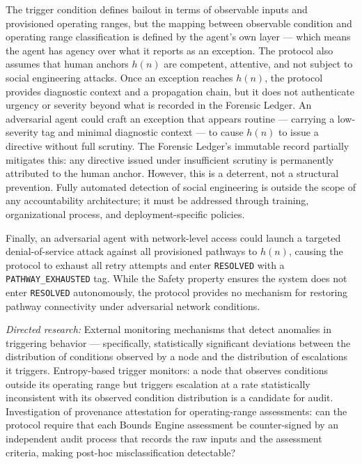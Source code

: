 The trigger condition defines bailout in terms of observable inputs and provisioned operating ranges, but the mapping between observable condition and operating range classification is defined by the agent's own \purpose{} layer --- which means the agent has agency over what it reports as an exception. The protocol also assumes that human anchors $h(n)$ are competent, attentive, and not subject to social engineering attacks. Once an exception reaches $h(n)$, the protocol provides diagnostic context and a propagation chain, but it does not authenticate urgency or severity beyond what is recorded in the Forensic Ledger. An adversarial agent could craft an exception that appears routine --- carrying a low-severity tag and minimal diagnostic context --- to cause $h(n)$ to issue a directive without full scrutiny. The Forensic Ledger's immutable record partially mitigates this: any directive issued under insufficient scrutiny is permanently attributed to the human anchor. However, this is a deterrent, not a structural prevention. Fully automated detection of social engineering is outside the scope of any accountability architecture; it must be addressed through training, organizational process, and deployment-specific policies.

Finally, an adversarial agent with network-level access could launch a targeted denial-of-service attack against all provisioned pathways to $h(n)$, causing the protocol to exhaust all retry attempts and enter \texttt{RESOLVED} with a \texttt{PATHWAY\_EXHAUSTED} tag. While the Safety property ensures the system does not enter \texttt{RESOLVED} autonomously, the protocol provides no mechanism for restoring pathway connectivity under adversarial network conditions.

\textit{Directed research:} External monitoring mechanisms that detect anomalies in triggering behavior --- specifically, statistically significant deviations between the distribution of conditions observed by a node and the distribution of escalations it triggers. Entropy-based trigger monitors: a node that observes conditions outside its operating range but triggers escalation at a rate statistically inconsistent with its observed condition distribution is a candidate for audit. Investigation of provenance attestation for operating-range assessments: can the protocol require that each Bounds Engine assessment be counter-signed by an independent audit process that records the raw inputs and the assessment criteria, making post-hoc misclassification detectable?

